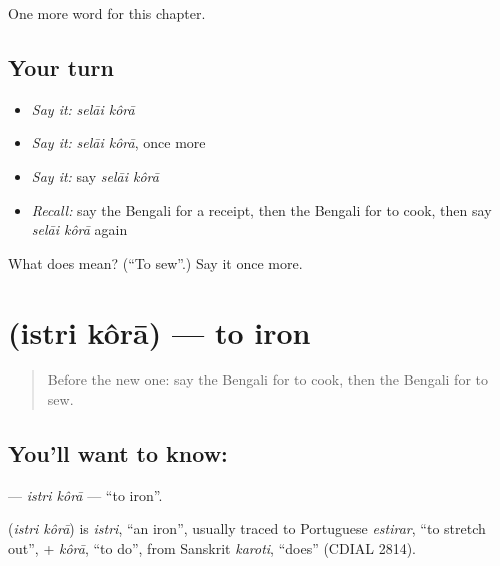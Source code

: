 \begin{grammarlens}[title={What you've built}]
One more word for this chapter.
\end{grammarlens}

\subsection*{Your turn}
\begin{itemize}
\raggedright
  \item \emph{Say it:} \emph{selāi kôrā}
  \item \emph{Say it:} \emph{selāi kôrā}, once more
  \item \emph{Say it:} say \emph{selāi kôrā}
  \item \emph{Recall:} say the Bengali for a receipt, then the Bengali for to cook, then say \emph{selāi kôrā} again
\end{itemize}

\begin{tcolorbox}[breakable,colback=teal!4,colframe=teal!35!black,title={Before you move on}]
What does   mean? (\textquotedblleft{}To sew\textquotedblright{}.) Say it once more.
\end{tcolorbox}
\section[\texorpdfstring{\bn{ইস্ত্রি} \bn{করা} (istri kôrā)}{ইস্ত্রি করা (istri kôrā)}]{  (istri kôrā) — to iron}

\label{lesson:BN-C148-istri-kora}



\begin{quote}
Before the new one: say the Bengali for to cook, then the Bengali for to sew.
\end{quote}

\subsection*{You'll want to know:  }
\textbf{ } — \emph{istri kôrā} — \textquotedblleft{}to iron\textquotedblright{}.

\begin{cousinweb}
\textbf{ } (\emph{istri kôrā}) is \emph{istri}, \textquotedblleft{}an iron\textquotedblright{}, usually traced to Portuguese \emph{estirar}, \textquotedblleft{}to stretch out\textquotedblright{}, + \emph{kôrā}, \textquotedblleft{}to do\textquotedblright{}, from Sanskrit \emph{karoti}, \textquotedblleft{}does\textquotedblright{} (CDIAL 2814).
\end{cousinweb}

